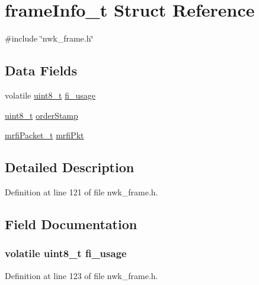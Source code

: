 \hypertarget{structframeInfo__t}{\section{frame\-Info\-\_\-t \-Struct \-Reference}
\label{structframeInfo__t}
}


{\ttfamily \#include \char`\"{}nwk\-\_\-frame.\-h\char`\"{}}

\subsection*{\-Data \-Fields}
\begin{DoxyCompactItemize}
\item 
volatile \hyperlink{bsp__msp430__defs_8h_aba7bc1797add20fe3efdf37ced1182c5}{uint8\-\_\-t} \hyperlink{structframeInfo__t_aa312b40e2a5575f0eef95b0c4e83df36}{fi\-\_\-usage}
\item 
\hyperlink{bsp__msp430__defs_8h_aba7bc1797add20fe3efdf37ced1182c5}{uint8\-\_\-t} \hyperlink{structframeInfo__t_a67b3ffbf7c3dc9ca9c1b6399c3e478a1}{order\-Stamp}
\item 
\hyperlink{structmrfiPacket__t}{mrfi\-Packet\-\_\-t} \hyperlink{structframeInfo__t_ac7a6c4fea11f56eda913e5c5b1092aa5}{mrfi\-Pkt}
\end{DoxyCompactItemize}


\subsection{\-Detailed \-Description}


\-Definition at line 121 of file nwk\-\_\-frame.\-h.



\subsection{\-Field \-Documentation}
\hypertarget{structframeInfo__t_aa312b40e2a5575f0eef95b0c4e83df36}{
\subsubsection[{fi\-\_\-usage}]{\setlength{\rightskip}{0pt plus 5cm}volatile {\bf uint8\-\_\-t} {\bf fi\-\_\-usage}}}\label{structframeInfo__t_aa312b40e2a5575f0eef95b0c4e83df36}


\-Definition at line 123 of file nwk\-\_\-frame.\-h.

